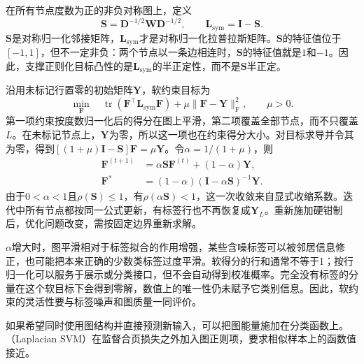 在所有节点度数为正的非负对称图上，定义
\begin{equation}
  \label{eq:classification-label-spreading-matrices}
  \bm{S}=\bm{D}^{-1/2}\bm{W}\bm{D}^{-1/2},
  \qquad
  \bm{L}_{\mathrm{sym}}=\bm{I}-\bm{S}.
\end{equation}
$\bm{S}$是对称归一化邻接矩阵，$\bm{L}_{\mathrm{sym}}$才是对称归一化拉普拉斯矩阵。$\bm{S}$的特征值位于$[-1,1]$，但不一定非负：两个节点以一条边相连时，$\bm{S}$的特征值就是$1$和$-1$。因此，支撑正则化目标凸性的是$\bm{L}_{\mathrm{sym}}$的半正定性，而不是$\bm{S}$半正定。

沿用未标记行置零的初始矩阵$\bm{Y}$，软约束目标为
\begin{equation}
  \label{eq:classification-label-spreading-objective}
  \min_{\bm{F}}\quad
    \operatorname{tr}
      (\bm{F}^{\top}\bm{L}_{\mathrm{sym}}\bm{F})
    +\mu\lVert\bm{F}-\bm{Y}\rVert_{\mathrm{F}}^2,
  \qquad \mu>0.
\end{equation}
第一项约束按度数归一化后的得分在图上平滑，第二项覆盖全部节点，而不只覆盖$L$。在未标记节点上，$\bm{Y}$为零，所以这一项也在约束得分大小。对目标求导并令其为零，得到$[(1+\mu)\bm{I}-\bm{S}]\bm{F}=\mu\bm{Y}$。令$\alpha=1/(1+\mu)$，则
\begin{equation}
  \label{eq:classification-label-spreading-fixed-point}
  \begin{aligned}
    \bm{F}^{(t+1)}
      &=\alpha\bm{S}\bm{F}^{(t)}+(1-\alpha)\bm{Y},\\
    \bm{F}^\ast
      &=(1-\alpha)(\bm{I}-\alpha\bm{S})^{-1}\bm{Y}.
  \end{aligned}
\end{equation}
由于$0<\alpha<1$且$\rho(\bm{S})\leq1$，有$\rho(\alpha\bm{S})<1$，这一次收敛来自显式收缩系数。迭代中所有节点都按同一公式更新，有标签行也不再恢复成$\bm{Y}_L$。重新施加硬钳制后，优化问题改变，需按固定边界重新求解。

$\alpha$增大时，图平滑相对于标签拟合的作用增强，某些含噪标签可以被邻居信息修正，也可能把本来正确的少数类标签过度平滑。软得分的行和通常不等于1；按行归一化可以服务于展示或分类接口，但不会自动得到校准概率。完全没有标签的分量在这个软目标下会得到零解，数值上的唯一性仍未赋予它类别信息。因此，软约束的灵活性要与标签噪声和图质量一同评价。

如果希望同时使用图结构并直接预测新输入，可以把图能量施加在分类函数上。（Laplacian SVM）在监督合页损失之外加入图正则项，要求相似样本上的函数值接近。

